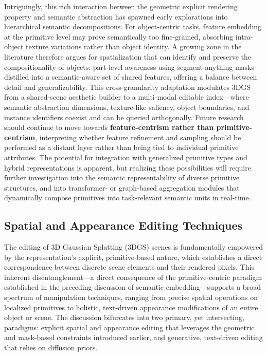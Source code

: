 \documentclass[11pt,a4paper]{article}
\begin{document}
Intriguingly, this rich interaction between the geometric explicit rendering property and semantic abstraction has spawned early explorations into hierarchical semantic decompositions. For object-centric tasks, feature embedding at the primitive level may prove semantically too fine-grained, absorbing intra-object texture variations rather than object identity. A growing zone in the literature therefore argues for spatialization that can identify and preserve the compositionality of objects: part-level awareness using segment-anything masks distilled into a semantic-aware set of shared features, offering a balance between detail and generalizability. This cross-granularity adaptation modulates 3DGS from a shared-scene aesthetic builder to a multi-modal editable index---where semantic abstraction dimensions, texture-like saliency, object boundaries, and instance identifiers coexist and can be queried orthogonally. Future research should continue to move towards \textbf{feature-centrism rather than primitive-centrism}, interpreting whether feature refinement and sampling should be performed as a distant layer rather than being tied to individual primitive attributes. The potential for integration with generalized primitive types and hybrid representations is apparent, but realizing these possibilities will require further investigation into the semantic representability of diverse primitive structures, and into transformer- or graph-based aggregation modules that dynamically compose primitives into task-relevant semantic units in real-time.


\subsection{Spatial and Appearance Editing Techniques}


The editing of 3D Gaussian Splatting (3DGS) scenes is fundamentally empowered by the representation's explicit, primitive-based nature, which establishes a direct correspondence between discrete scene elements and their rendered pixels. This inherent disentanglement---a direct consequence of the primitive-centric paradigm established in the preceding discussion of semantic embedding---supports a broad spectrum of manipulation techniques, ranging from precise spatial operations on localized primitives to holistic, text-driven appearance modifications of an entire object or scene. The discussion bifurcates into two primary, yet intersecting, paradigms: explicit spatial and appearance editing that leverages the geometric and mask-based constraints introduced earlier, and generative, text-driven editing that relies on diffusion priors.
\end{document}
